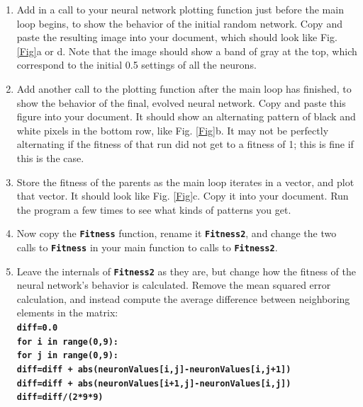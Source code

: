 \documentclass[12pt]{article}
\begin{document}
\begin{enumerate}
\item Add in a call to your neural network plotting function just before the main loop begins, to show the behavior of the initial random network. Copy and paste the resulting image into your document, which should look like Fig. \ref{Fig}a or d. Note that the image should show a band of gray at the top, which correspond to the initial 0.5 settings of all the neurons.

\item Add another call to the plotting function after the main loop has finished, to show the behavior of the final, evolved neural network. Copy and paste this figure into your document. It should show an alternating pattern of black and white pixels in the bottom row, like Fig. \ref{Fig}b. It may not be perfectly alternating if the fitness of that run did not get to a fitness of 1; this is fine if this is the case.

\item Store the fitness of the parents as the main loop iterates in a vector, and plot that vector. It should look like Fig. \ref{Fig}c. Copy it into your document. Run the program a few times to see what kinds of patterns you get.

\item Now copy the \textbf{\texttt{Fitness}} function, rename it \textbf{\texttt{Fitness2}}, and change the two calls to \textbf{\texttt{Fitness}} in your main function to calls to \textbf{\texttt{Fitness2}}.

\item Leave the internals of \textbf{\texttt{Fitness2}} as they are, but change how the fitness of the neural network's behavior is calculated. Remove the mean squared error calculation, and instead compute the average difference between neighboring elements in the matrix: \\
\textbf{\texttt{diff=0.0}}\\
\textbf{\texttt{for i in range(0,9):}}\\
\indent \textbf{\texttt{\hspace{1cm}for j in range(0,9):}}\\
\indent \textbf{\texttt{\hspace{2cm}diff=diff + abs(neuronValues[i,j]-neuronValues[i,j+1])}}\\
\indent \textbf{\texttt{\hspace{2cm}diff=diff + abs(neuronValues[i+1,j]-neuronValues[i,j])}}\\
\textbf{\texttt{diff=diff/(2*9*9)}}


\end{enumerate}
\end{document}
